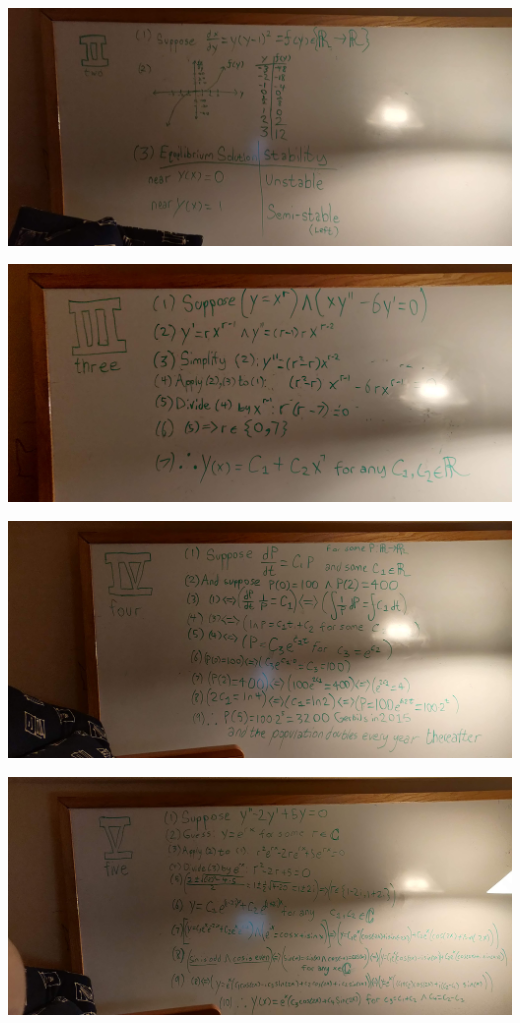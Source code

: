 \documentclass[12pt]{article}
\begin{document}
\includegraphics[scale=0.075]{2.jpg}

\includegraphics[scale=0.075]{3.jpg}

\includegraphics[scale=0.075]{4.jpg}

\includegraphics[scale=0.075]{5.jpg}
\end{document}
